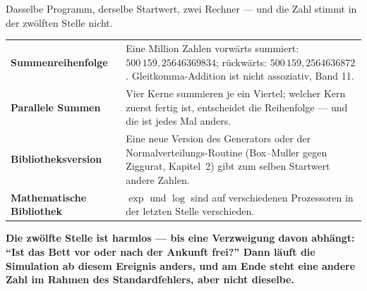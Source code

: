 \begin{warnung}
Dasselbe Programm, derselbe Startwert, zwei Rechner --- und die Zahl stimmt in der zwölften Stelle nicht.

\begin{center}
{\small
\renewcommand{\arraystretch}{1.5}
\begin{tabular}{@{}P{3.2cm}P{5.4cm}@{}}
\toprule
\textbf{Summen\-reihenfolge} & Eine Million Zahlen vorwärts summiert: $500\,159{,}25646369834$; rückwärts: $500\,159{,}2564636872$. Gleitkomma-Addition ist nicht assoziativ, Band 11.\\
\textbf{Parallele Summen} & Vier Kerne summieren je ein Viertel; welcher Kern zuerst fertig ist, entscheidet die Reihenfolge --- und die ist jedes Mal anders.\\
\textbf{Bibliotheksversion} & Eine neue Version des Generators oder der Normalverteilungs-Routine (Box--Muller gegen Ziggurat, Kapitel~2) gibt zum selben Startwert andere Zahlen.\\
\textbf{Mathematische Biblio\-thek} & $\exp$ und $\log$ sind auf verschiedenen Prozessoren in der letzten Stelle verschieden.\\
\bottomrule
\end{tabular}}
\end{center}

\begin{center}
\begin{minipage}{0.9\textwidth}
\textbf{Die zwölfte Stelle ist harmlos --- bis eine Verzweigung davon abhängt: \enquote{Ist das Bett vor oder nach der Ankunft frei?} Dann läuft die Simulation ab diesem Ereignis anders, und am Ende steht eine andere Zahl im Rahmen des Standardfehlers, aber nicht dieselbe.}
\end{minipage}
\end{center}

\begin{center}
\begin{minipage}{0.88\textwidth}
\end{minipage}
\end{center}
\end{warnung}

